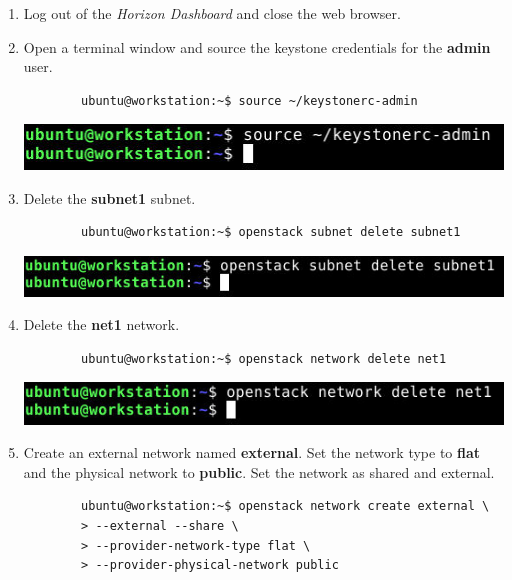 \documentclass[letterpaper, 12pt]{article}
\begin{document}
\begin{enumerate}
    \item Log out of the \textit{Horizon Dashboard} and close the web browser.
    
    \item Open a terminal window and source the keystone credentials for the \textbf{admin} user.
    \begin{lstlisting}
        ubuntu@workstation:~$ source ~/keystonerc-admin
    \end{lstlisting}

    \begin{center}
        \includegraphics[width=\linewidth]{images/part1/step9.png}
    \end{center}

    \item Delete the \textbf{subnet1} subnet.
    \begin{lstlisting}
        ubuntu@workstation:~$ openstack subnet delete subnet1
    \end{lstlisting}

    \begin{center}
        \includegraphics[width=\linewidth]{images/part1/step10.png}
    \end{center}

    \item Delete the \textbf{net1} network.
    \begin{lstlisting}
        ubuntu@workstation:~$ openstack network delete net1
    \end{lstlisting}

    \begin{center}
        \includegraphics[width=\linewidth]{images/part1/step11.png}
    \end{center}

    \item Create an external network named \textbf{external}. Set the network type to \textbf{flat} and the physical
    network to \textbf{public}. Set the network as shared and external.
    \begin{lstlisting}
        ubuntu@workstation:~$ openstack network create external \
        > --external --share \
        > --provider-network-type flat \
        > --provider-physical-network public
    \end{lstlisting}


\end{enumerate}
\end{document}
